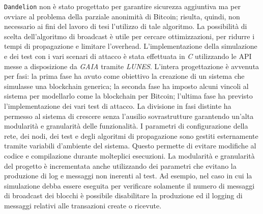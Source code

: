 \texttt{Dandelion} non è stato progettato per garantire sicurezza aggiuntiva ma per ovviare al problema della parziale anonimità di Bitcoin; risulta, quindi, non necessario ai fini del lavoro di tesi l'utilizzo di tale algoritmo.
La possibilità di scelta dell'algoritmo di broadcast è utile per cercare ottimizzazioni, per ridurre i tempi di propagazione e limitare l'overhead.\newline\newline
L'implementazione della simulazione e dei test con i vari scenari di attacco è stata effettuata in \textit{C} utilizzando le API messe a disposizione da \textit{GAIA} tramite \textit{LUNES}.\newline
L'intera progettazione è avvenuta per fasi: la prima fase ha avuto come obiettivo la creazione di un sistema che simulasse una blockchain generica; la seconda fase ha imposto alcuni vincoli al sistema per modellarlo come la blockchain per Bitcoin; l'ultima fase ha previsto l'implementazione dei vari test di attacco.\newline
La divisione in fasi distinte ha permesso al sistema di crescere senza l'ausilio sovrastrutture garantendo un'alta modularità e granularità delle funzionalità.\newline
I parametri di configurazione della rete, dei nodi, dei test e degli algoritmi di propagazione sono gestiti esternamente tramite variabili d'ambiente del sistema. Questo permette di evitare modifiche al codice e compilazione durante molteplici esecuzioni. La modularità e granularità del progetto è incrementata anche utilizzando dei parametri che evitano la produzione di log e messaggi non inerenti al test. Ad esempio, nel caso in cui la simulazione debba essere eseguita per verificare solamente il numero di messaggi di broadcast dei blocchi è possibile disabilitare la produzione ed il logging di messaggi relativi alle transazioni create o ricevute.\newline

